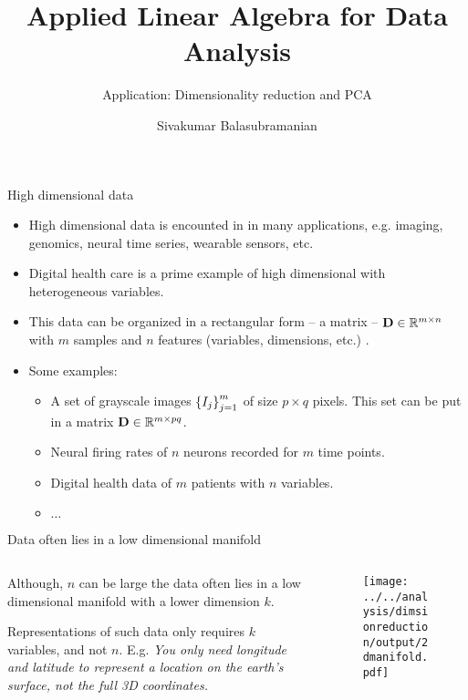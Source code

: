 \documentclass[aspectratio=169]{beamer}
\title{Applied Linear Algebra for Data Analysis}
\subtitle{Application: Dimensionality reduction and PCA}
\author{Sivakumar Balasubramanian}
\institute[Christian Medical College] %
{
  \inst{}%
  Department of Bioengineering\\
  Christian Medical College, Bagayam\\
  Vellore 632002
}
\date{}
\let\olditem\item
\renewcommand{\item}{\setlength{\itemsep}{\fill}\olditem}
\def\mf{\ensuremath\mathbf}
\def\mb{\ensuremath\mathbb}
\def\lc{\ensuremath\left\{}
\def\rc{\ensuremath\right\}}
\begin{document}


\begin{frame}
  \titlepage
\end{frame}


\begin{frame}[t]{High dimensional data}
\begin{itemize}
    \item High dimensional data is encounted in in many applications, e.g. imaging, genomics, neural time series, wearable sensors, etc.
    \item Digital health care is a prime example of high dimensional with heterogeneous variables.
    \item This data can be organized in a rectangular form -- a matrix -- $\mf{D} \in \mb{R}^{m \times n}$ with $m$ samples and $n$ features (variables, dimensions, etc.) .
    \item Some examples:
    \begin{itemize}
      \item A set of grayscale images $\lc I_j\rc_{j=1}^m$ of size $p \times q$ pixels. This set can be put in a matrix $\mf{D} \in \mb{R}^{m \times pq}$.
      \item Neural firing rates of $n$ neurons recorded for $m$ time points.
      \item Digital health data of $m$ patients with $n$ variables.
      \item $\ldots$ 
    \end{itemize}
\end{itemize}
\end{frame}


\begin{frame}[t]{Data often lies in a low dimensional manifold}
  \begin{columns}
    \begin{column}{0.4\textwidth}
      Although, $n$ can be large the data often lies in a low dimensional manifold with a lower dimension $k$.
      \vspace{0.2cm}

      Representations of such data only requires $k$ variables, and not $n$. E.g. \textit{You only need longitude and latitude to represent a location on the earth's surface, not the full 3D coordinates.}
    \end{column}
    \begin{column}{0.575\textwidth}
      \begin{figure}
        \centering
        \texttt{[image: ../../analysis/dimsionreduction/output/2dmanifold.pdf]}
      \end{figure}
    \end{column}
  \end{columns}
\end{frame}
\end{document}
